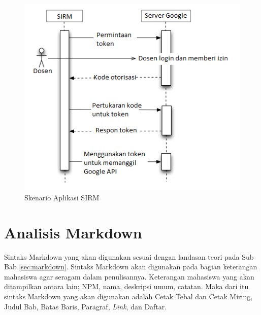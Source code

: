 \begin{figure}[ht]
\centering
\includegraphics[scale=1]{Gambar/skenarioaplikasisirm.png}
\caption[Skenario Aplikasi SIRM]{Skenario Aplikasi SIRM} 
\label{fig:skenarioaplikasisirm}
\end{figure}

\section{Analisis Markdown}
\label{sec:analisisMarkdown}
Sintaks Markdown yang akan digunakan sesuai dengan landasan teori pada Sub Bab
\ref{sec:markdown}. Sintaks Markdown akan digunakan pada bagian keterangan
mahasiswa agar seragam dalam penulisannya. Keterangan mahasiswa yang akan
ditampilkan antara lain; NPM, nama, deskripsi umum, catatan. Maka dari itu
sintaks Markdown yang akan digunakan adalah Cetak Tebal dan Cetak Miring, Judul
Bab, Batas Baris, Paragraf, {\it Link}, dan Daftar.

